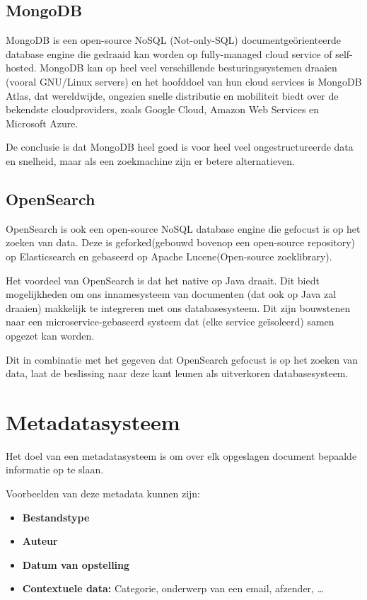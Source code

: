 \subsection{MongoDB}
MongoDB is een open-source NoSQL (Not-only-SQL) documentgeörienteerde database engine die gedraaid kan worden op fully-managed cloud service of self-hosted.
MongoDB kan op heel veel verschillende besturingssystemen draaien (vooral GNU/Linux servers) en het hoofddoel van hun cloud services is MongoDB Atlas, dat wereldwijde,
ongezien snelle distributie en mobiliteit biedt over de bekendste cloudproviders, zoals Google Cloud, Amazon Web Services en Microsoft Azure.

De conclusie is dat MongoDB heel goed is voor heel veel ongestructureerde data en snelheid, maar als een zoekmachine zijn er betere alternatieven.

\subsection{OpenSearch}
OpenSearch is ook een open-source NoSQL database engine die gefocust is op het zoeken van data.
Deze is geforked(gebouwd bovenop een open-source repository) op Elasticsearch en gebaseerd op Apache Lucene(Open-source zoeklibrary).

Het voordeel van OpenSearch is dat het native op Java draait.
Dit biedt mogelijkheden om ons innamesysteem van documenten (dat ook op Java zal draaien) makkelijk te integreren met ons databasesysteem.
Dit zijn bouwstenen naar een microservice-gebaseerd systeem dat (elke service geïsoleerd) samen opgezet kan worden.

Dit in combinatie met het gegeven dat OpenSearch gefocust is op het zoeken van data, laat de beslissing naar deze kant leunen als uitverkoren databasesysteem.

\section{Metadatasysteem}
Het doel van een metadatasysteem is om over elk opgeslagen document bepaalde informatie op te slaan.

Voorbeelden van deze metadata kunnen zijn:
\begin{itemize}
	\item \textbf{Bestandstype}
	\item \textbf{Auteur}
	\item \textbf{Datum van opstelling}
	\item \textbf{Contextuele data:} Categorie, onderwerp van een email, afzender, \dots
\end{itemize}

